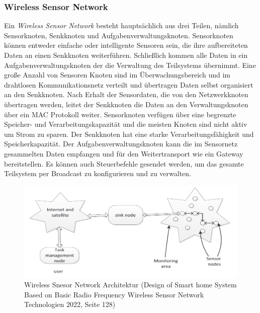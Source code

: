 \documentclass[a4paper,12pt]{scrartcl}
\begin{document}

\newpage
\subsubsection{Wireless Sensor Network}
Ein \textit{Wireless Sensor Network} besteht hauptsächlich aus drei Teilen, nämlich Sensorknoten, Senkknoten
und Aufgabenverwaltungsknoten.
Sensorknoten können entweder einfache oder intelligente Sensoren sein, die ihre aufbereiteten Daten an einen Senkknoten weiterführen. Schließlich kommen alle Daten in ein Aufgabenverwaltungsknoten der die Verwaltung des Teilsystems übernimmt.
Eine große Anzahl von Sensoren Knoten sind im Überwachungsbereich und im drahtlosen Kommunikationsnetz verteilt und übertragen Daten selbst organisiert an den Senkknoten. Nach Erhalt der Sensordaten, die von den Netzwerkknoten übertragen werden, leitet der Senkknoten die Daten an den
Verwaltungsknoten über ein MAC Protokoll weiter.
Sensorknoten verfügen über eine begrenzte Speicher- und Verarbeitungskapazität und die meisten Knoten sind nicht aktiv
um Strom zu sparen. Der Senkknoten
hat eine starke Verarbeitungsfähigkeit und Speicherkapazität. Der Aufgabenverwaltungsknoten kann die im Sensornetz gesammelten Daten empfangen und für den Weitertransport wie ein Gateway bereitstellen. Es können auch Steuerbefehle gesendet werden, um das gesamte Teilsystem per Broadcast zu konfigurieren und zu verwalten. \cite{[4] Seite 128 ff}
\vspace{0.5cm}
\begin{figure}[H]
\includegraphics[scale=0.85]{picture/WSN}
\caption{Wireless Snesor Network Architektur (Design of Smart home System Based on Basic Radio Frequency Wireless Sensor Network Technologien 2022, Seite 128)}
\label{fig:Wireless Snesor Network Architektur}
\end{figure}
\end{document}
